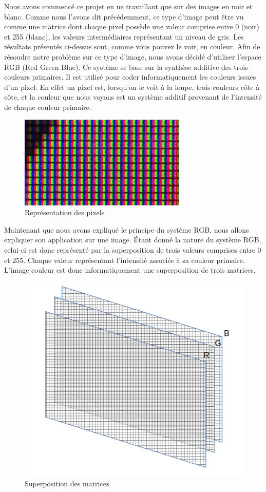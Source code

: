 Nous avons commencé ce projet en ne travaillant que sur des images en noir et blanc. Comme nous l'avons dit précédemment, ce type d'image peut être vu comme une matrice dont chaque pixel possède une valeur comprise entre 0 (noir) et 255 (blanc), les valeurs intermédiaires représentant un niveau de gris. Les résultats présentés ci-dessus sont, comme vous pouvez le voir, en couleur. Afin de résoudre notre problème sur ce type d'image, nous avons décidé d'utiliser l'espace RGB (Red Green Blue). Ce système se base sur la synthèse additive des trois couleurs primaires. Il est utilisé pour coder informatiquement les couleurs issues d'un pixel. En effet un pixel est, lorsqu'on le voit à la loupe, trois couleurs côte à côte, et la couleur que nous voyons est un système additif provenant de l'intensité de chaque couleur primaire. 
 
\begin{figure}[H]
 \centering
\includegraphics[scale=0.5]{Images/pixel.jpg}
 \caption{Représentation des pixels}
  \end{figure}
  
 Maintenant que nous avons expliqué le principe du système RGB, nous allons expliquer son application sur une image. Étant donné la nature du système RGB, celui-ci est donc représenté par la superposition de trois valeurs comprises entre 0 et 255. Chaque valeur représentant l'intensité associée à sa couleur primaire. L'image couleur est donc informatiquement une superposition de trois matrices.
 \begin{figure}[H]
 \centering
 \includegraphics[scale=0.2]{Images/rgb.png}
 \caption{Superposition des matrices}
 \end{figure}
 

